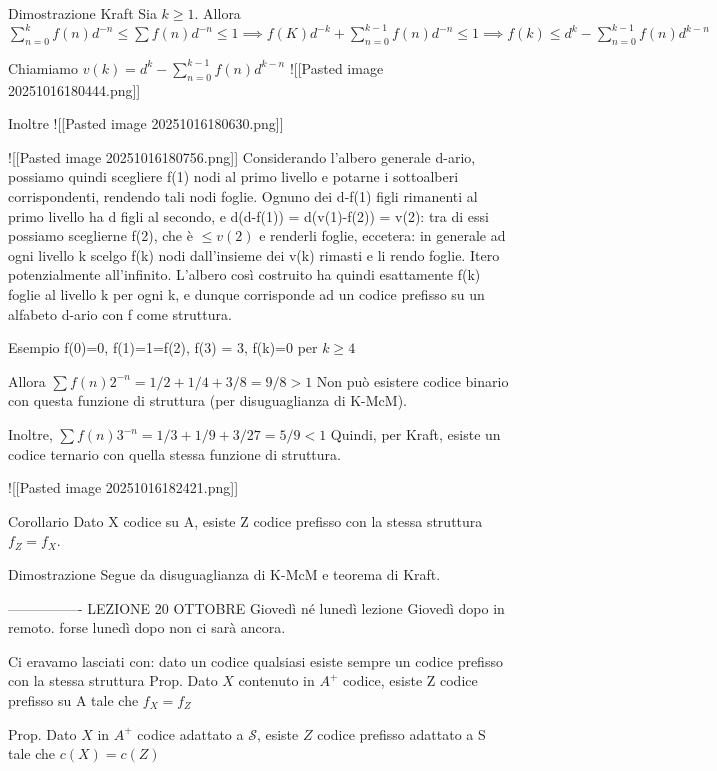 Dimostrazione Kraft
Sia $k\ge 1$. Allora $\sum_{n=0}^k f(n)d^{-n} \le \sum f(n)d^{-n} \le 1 \implies f(K)d^{-k} + \sum_{n=0}^{k-1}f(n)d^{-n} \le 1 \implies f(k) \le d^k - \sum_{n=0}^{k-1}f(n)d^{k-n}$

Chiamiamo $v(k)=d^k-\sum_{n=0}^{k-1}f(n)d^{k-n}$
![[Pasted image 20251016180444.png]]

Inoltre
![[Pasted image 20251016180630.png]]

![[Pasted image 20251016180756.png]]
Considerando l'albero generale d-ario, possiamo quindi scegliere f(1) nodi al primo livello e potarne i sottoalberi corrispondenti, rendendo tali nodi foglie.
Ognuno dei d-f(1) figli rimanenti al primo livello ha d figli al secondo, e d(d-f(1)) = d(v(1)-f(2)) = v(2): tra di essi possiamo sceglierne f(2), che è $\le v(2)$ e renderli foglie, eccetera: in generale ad ogni livello k scelgo f(k) nodi dall'insieme dei v(k) rimasti e li rendo foglie. Itero potenzialmente all'infinito. L'albero così costruito ha quindi esattamente f(k) foglie al livello k per ogni k, e dunque corrisponde ad un codice prefisso su un alfabeto d-ario con f come struttura.


Esempio
f(0)=0, f(1)=1=f(2), f(3) = 3, f(k)=0 per $k\ge 4$

Allora $\sum f(n)2^{-n}=1/2 +1/4 + 3/8 = 9/8 \gt 1$
Non può esistere codice binario con questa funzione di struttura (per disuguaglianza di K-McM).

Inoltre, $\sum f(n)3^{-n} = 1/3 + 1/9 + 3/27 = 5/9 \lt 1$
Quindi, per Kraft, esiste un codice ternario con quella stessa funzione di struttura.

![[Pasted image 20251016182421.png]]


Corollario
Dato X codice su A, esiste Z codice prefisso con la stessa struttura $f_Z=f_X$.

Dimostrazione
Segue da disuguaglianza di K-McM e teorema di Kraft.






----------------
LEZIONE 20 OTTOBRE
Giovedì né lunedì lezione
Giovedì dopo in remoto. forse lunedì dopo non ci sarà ancora.

Ci eravamo lasciati con: dato un codice qualsiasi esiste sempre un codice prefisso con la stessa struttura
Prop.
Dato $X$ contenuto in $A^+$ codice, esiste Z codice prefisso su A tale che $f_X=f_Z$

Prop.
Dato $X$ in $A^+$ codice adattato a $\mathcal{S}$, esiste $Z$ codice prefisso adattato a S tale che $c(X)=c(Z)$

